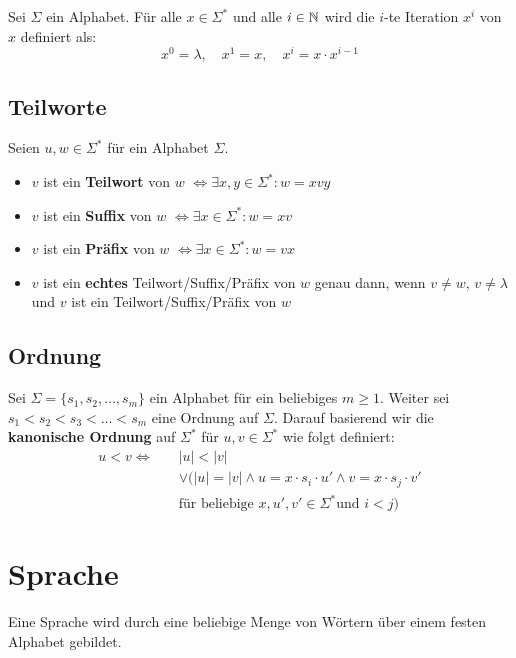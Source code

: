 \begin{definition}
Sei $\Sigma$ ein Alphabet. Für alle $x \in \Sigma^*$ und alle $i \in \mathbb{N}$ wird die $i$-te Iteration $x^i$ von $x$ definiert als:
\[
x^0 = \lambda,\quad x^1 = x,\quad x^i = x \cdot x^{i-1}
\]
\end{definition}

\subsection{Teilworte}
\begin{definition}
Seien $u, w \in \Sigma^*$ für ein Alphabet $\Sigma$.
\begin{itemize}
  \item $v$ ist ein \textbf{Teilwort} von $w$ $\Leftrightarrow \exists x, y \in \Sigma^*: w = xvy$
  \item $v$ ist ein \textbf{Suffix} von $w$ $\Leftrightarrow \exists x \in \Sigma^*: w = xv$
  \item $v$ ist ein \textbf{Präfix} von $w$ $\Leftrightarrow \exists x \in \Sigma^*: w = vx$
  \item $v$ ist ein \textbf{echtes} Teilwort/Suffix/Präfix von $w$ genau dann, wenn $v \not= w$, $v \not= \lambda$ und $v$ ist ein Teilwort/Suffix/Präfix von $w$
\end{itemize}

\end{definition}

\subsection{Ordnung}
\begin{definition}
Sei $\Sigma = \{s_1, s_2, \ldots, s_m\}$ ein Alphabet für ein beliebiges $m \geq 1$. Weiter sei $s_1 < s_2 < s_3 < \ldots < s_m$ eine Ordnung auf $\Sigma$. Darauf basierend wir die \textbf{kanonische Ordnung} auf $\Sigma^*$ für $u, v \in \Sigma^*$ wie folgt definiert:
\begin{align*}
u < v \Leftrightarrow \quad & |u| < |v|\\
&\lor (|u| = |v| \land u = x \cdot s_i \cdot u' \land v = x \cdot s_j \cdot v'\\
&\text{für beliebige } x, u', v' \in \Sigma^* \text{und } i < j)
\end{align*}

\end{definition}

\section{Sprache}
Eine Sprache wird durch eine beliebige Menge von Wörtern über einem festen Alphabet gebildet.

